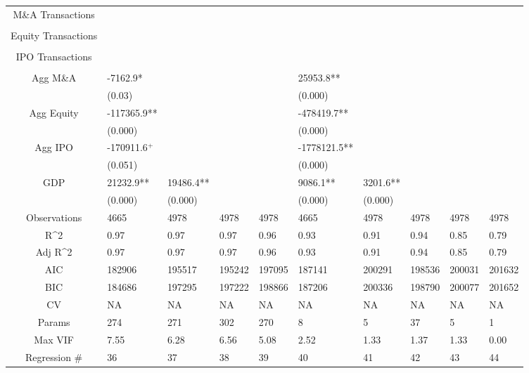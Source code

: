 \documentclass{article}
\begin{document}
\begin{table}[H]
\begin{tabular}{|clllllllll|}
  M\&A Transactions &  &  &  &  &  &  &  &  &  \\ 
   &  &  &  &  &  &  &  &  &  \\ 
  Equity Transactions &  &  &  &  &  &  &  &  &  \\ 
   &  &  &  &  &  &  &  &  &  \\ 
  IPO Transactions &  &  &  &  &  &  &  &  &  \\ 
   &  &  &  &  &  &  &  &  &  \\ 
  Agg M\&A & -7162.9* &  &  &  & 25953.8** &  &  &  &  \\ 
   & (0.03) &  &  &  & (0.000) &  &  &  &  \\ 
  Agg Equity & -117365.9** &  &  &  & -478419.7** &  &  &  &  \\ 
   & (0.000) &  &  &  & (0.000) &  &  &  &  \\ 
  Agg IPO & -170911.6$^{+}$ &  &  &  & -1778121.5** &  &  &  &  \\ 
   & (0.051) &  &  &  & (0.000) &  &  &  &  \\ 
  GDP & 21232.9** & 19486.4** &  &  & 9086.1** & 3201.6** &  &  &  \\ 
   & (0.000) & (0.000) &  &  & (0.000) & (0.000) &  &  &  \\ 
  \hline 
 Observations & 4665 & 4978 & 4978 & 4978 & 4665 & 4978 & 4978 & 4978 & 4978 \\ 
  R^2 & 0.97 & 0.97 & 0.97 & 0.96 & 0.93 & 0.91 & 0.94 & 0.85 & 0.79 \\ 
  Adj R^2 & 0.97 & 0.97 & 0.97 & 0.96 & 0.93 & 0.91 & 0.94 & 0.85 & 0.79 \\ 
  AIC & 182906 & 195517 & 195242 & 197095 & 187141 & 200291 & 198536 & 200031 & 201632 \\ 
  BIC & 184686 & 197295 & 197222 & 198866 & 187206 & 200336 & 198790 & 200077 & 201652 \\ 
  CV & NA & NA & NA & NA & NA & NA & NA & NA & NA \\ 
  Params & 274 & 271 & 302 & 270 & 8 & 5 & 37 & 5 & 1 \\ 
  Max VIF & 7.55 & 6.28 & 6.56 & 5.08 & 2.52 & 1.33 & 1.37 & 1.33 & 0.00 \\ 
  Regression \# & 36 & 37 & 38 & 39 & 40 & 41 & 42 & 43 & 44 \\ 
   \hline
\end{tabular}
 
\end{table}
\end{document}
